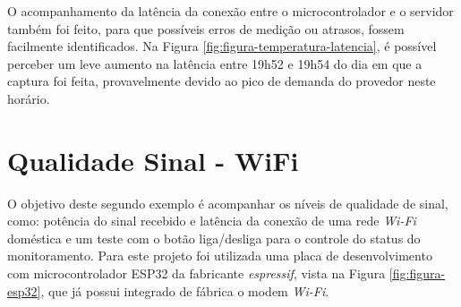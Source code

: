         \begin{figure}[!h]
    	\end{figure}
    	
O acompanhamento da latência da conexão entre o microcontrolador e o servidor também foi feito, para que possíveis erros de medição ou atrasos, fossem facilmente identificados. Na Figura \ref{fig:figura-temperatura-latencia}, é possível perceber um leve aumento na latência entre 19h52 e 19h54 do dia em que a captura foi feita, provavelmente devido ao pico de demanda do provedor neste horário.
    	
        \begin{figure}[!h]
    	\end{figure}
\section{Qualidade Sinal - WiFi}
\label{sec:qualidade-sinal}

O objetivo deste segundo exemplo é acompanhar os níveis de qualidade de sinal, como: potência do sinal recebido e latência da conexão de uma rede  \textit{Wi-Fi} doméstica e um teste com o botão liga/desliga para o controle do status do monitoramento. Para este projeto foi utilizada uma placa de desenvolvimento com microcontrolador ESP32 da fabricante \textit{espressif}, vista na Figura \ref{fig:figura-esp32}, que já possui integrado de fábrica o modem \textit{Wi-Fi}.

